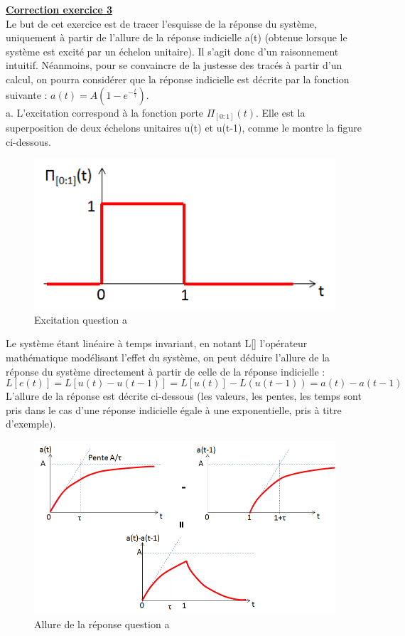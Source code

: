 \documentclass[11pt]{report}
\begin{document}
 	\textbf{\underline{Correction exercice 3}}\\
 	
 	Le but de cet exercice est de tracer l'esquisse de la réponse du système, uniquement à partir de l'allure de la réponse indicielle a(t) (obtenue lorsque le système est excité par un échelon unitaire). Il s'agit donc d'un raisonnement intuitif. Néanmoins, pour se convaincre de la justesse des tracés à partir d'un calcul, on pourra considérer que la réponse indicielle est décrite par la fonction suivante : $a(t) = A(1-e^{-\frac{t}{\tau}})$.\\
 	
 	a. L'excitation correspond à la fonction porte $\Pi_{[0:1]}(t)$. Elle est la superposition de deux échelons unitaires u(t) et u(t-1), comme le montre la figure ci-dessous. 
 	\begin{figure}[h!]
 		\centering
 		\includegraphics[scale=0.55]{images/excitation_Exo_2_3_a.png} 
 		\caption{Excitation question a}	
 	\end{figure}
 	
 	Le système étant linéaire à temps invariant, en notant L[] l'opérateur mathématique modélisant l'effet du système, on peut déduire l'allure de la réponse du système directement à partir de celle de la réponse indicielle :
 	\begin{equation*}
 	L[e(t)]=L[u(t)-u(t-1)]=L[u(t)]-L(u(t-1))=a(t)-a(t-1)
 	\end{equation*}
 	L'allure de la réponse est décrite ci-dessous (les valeurs, les pentes, les temps sont pris dans le cas d'une réponse indicielle égale à une exponentielle, pris à titre d'exemple).\\
 	\begin{figure}[h!]
 		\centering
 		\includegraphics[scale=0.55]{images/allure_exo_2_3_a.png} 
 		\caption{Allure de la réponse question a}	
 	\end{figure}
 
\end{document}
